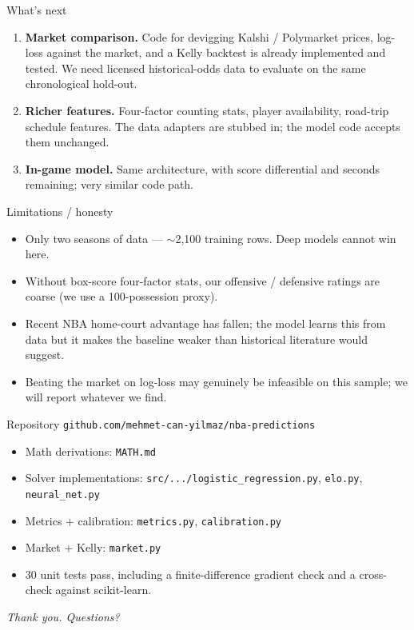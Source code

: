 \documentclass[10pt,aspectratio=169]{beamer}
\begin{document}
\begin{frame}{What's next}
  \begin{enumerate}
    \item \textbf{Market comparison.} Code for devigging Kalshi /
      Polymarket prices, log-loss against the market, and a Kelly
      backtest is already implemented and tested. We need licensed
      historical-odds data to evaluate on the same chronological hold-out.
    \item \textbf{Richer features.} Four-factor counting stats,
      player availability, road-trip schedule features. The data
      adapters are stubbed in; the model code accepts them
      unchanged.
    \item \textbf{In-game model.} Same architecture, with score
      differential and seconds remaining; very similar code path.
  \end{enumerate}
\end{frame}

\begin{frame}{Limitations / honesty}
  \begin{itemize}
    \item Only two seasons of data --- $\sim$2{,}100 training rows.
      Deep models cannot win here.
    \item Without box-score four-factor stats, our offensive / defensive
      ratings are coarse (we use a 100-possession proxy).
    \item Recent NBA home-court advantage has fallen; the model
      learns this from data but it makes the baseline weaker than
      historical literature would suggest.
    \item Beating the market on log-loss may genuinely be infeasible
      on this sample; we will report whatever we find.
  \end{itemize}
\end{frame}

\begin{frame}{Repository}
  \centering
  \texttt{github.com/mehmet-can-yilmaz/nba-predictions}

  \vfill
  \begin{itemize}
    \item Math derivations: \texttt{MATH.md}
    \item Solver implementations: \texttt{src/.../logistic\_regression.py},
      \texttt{elo.py}, \texttt{neural\_net.py}
    \item Metrics + calibration: \texttt{metrics.py}, \texttt{calibration.py}
    \item Market + Kelly: \texttt{market.py}
    \item 30 unit tests pass, including a finite-difference gradient
      check and a cross-check against scikit-learn.
  \end{itemize}

  \vfill
  \begin{center}
    \large \emph{Thank you. Questions?}
  \end{center}
\end{frame}
\end{document}
